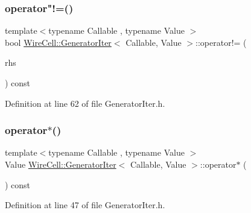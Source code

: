 \subsubsection{\texorpdfstring{operator"!=()}{operator!=()}}
{\footnotesize\ttfamily template$<$typename Callable , typename Value $>$ \\
bool \hyperlink{struct_wire_cell_1_1_generator_iter}{Wire\+Cell\+::\+Generator\+Iter}$<$ Callable, Value $>$\+::operator!= (\begin{DoxyParamCaption}\item[{const \hyperlink{struct_wire_cell_1_1_generator_iter}{Generator\+Iter}$<$ Callable, Value $>$ \&}]{rhs }\end{DoxyParamCaption}) const\hspace{0.3cm}{\ttfamily [inline]}}



Definition at line 62 of file Generator\+Iter.\+h.

\mbox{\label{struct_wire_cell_1_1_generator_iter_a6ef28188ca78788ba30d7960b2b48e12}} 
\subsubsection{\texorpdfstring{operator$\ast$()}{operator*()}}
{\footnotesize\ttfamily template$<$typename Callable , typename Value $>$ \\
Value \hyperlink{struct_wire_cell_1_1_generator_iter}{Wire\+Cell\+::\+Generator\+Iter}$<$ Callable, Value $>$\+::operator$\ast$ (\begin{DoxyParamCaption}{ }\end{DoxyParamCaption}) const\hspace{0.3cm}{\ttfamily [inline]}}



Definition at line 47 of file Generator\+Iter.\+h.

\mbox{\label{struct_wire_cell_1_1_generator_iter_afdbd700ee6f8d0e518b39ec585de2af8}} 
